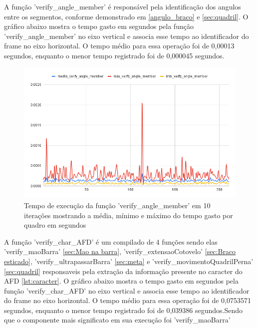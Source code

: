 A função 'verify\_angle\_member' é responsável pela identificação dos angulos entre os segmentos, conforme demonstrado em \ref{angulo_braco} e \ref{sec:quadril}. O gráfico abaixo mostra o tempo gasto em segundos pela função 'verify\_angle\_member' no eixo vertical e associa esse tempo ao identificador do frame no eixo horizontal. O tempo médio para essa operação foi de 0,00013 segundos, enquanto o menor tempo registrado foi de 0,000045 segundos.

\begin{figure}[!htb]
	\centering
	\includegraphics[scale=0.6]{figuras/grafico/angulo.png}
	\caption{Tempo de execução da função 'verify\_angle\_member' em 10 iterações mostrando a média, mínimo e máximo do tempo gasto por quadro em segundos}
\end{figure}




\begin{sloppypar}
    A função 'verify\_char\_AFD' é um compilado de 4 funções sendo elas 'verify\_maoBarra' \ref{sec:Mao na barra}, 'verify\_extensaoCotovelo' \ref{sec:Braco esticado}, 'verify\_ultrapassarBarra' \ref{sec:meta} e 'verify\_movimentoQuadrilPerna' \ref{sec:quadril} responsaveis pela extração da informação presente no caracter do \ac{AFD} \ref{lst:caracter}. O gráfico abaixo mostra o tempo gasto em segundos pela função 'verify\_char\_AFD' no eixo vertical e associa esse tempo ao identificador do frame no eixo horizontal. O tempo médio para essa operação foi de 0,0753571 segundos, enquanto o menor tempo registrado foi de 0,039386 segundos.Sendo que o componente mais significato em sua execução foi 'verify\_maoBarra' 
\end{sloppypar}


